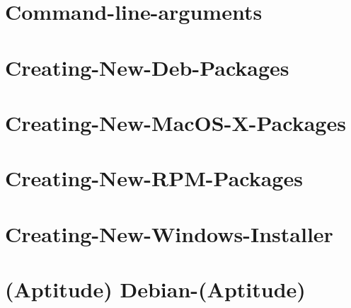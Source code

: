 \documentclass[twoside]{book}
\begin{document}
\chapter{Command-\/line-\/arguments}
\label{md__home_kodemonkey_workspace__t_s_g_l_docs-wiki__command-line-arguments}
\hypertarget{md__home_kodemonkey_workspace__t_s_g_l_docs-wiki__command-line-arguments}{}

\chapter{Creating-\/\-New-\/\-Deb-\/\-Packages}
\label{md__home_kodemonkey_workspace__t_s_g_l_docs-wiki__creating-_new-_deb-_packages}
\hypertarget{md__home_kodemonkey_workspace__t_s_g_l_docs-wiki__creating-_new-_deb-_packages}{}

\chapter{Creating-\/\-New-\/\-Mac\-O\-S-\/\-X-\/\-Packages}
\label{md__home_kodemonkey_workspace__t_s_g_l_docs-wiki__creating-_new-_mac_o_s-_x-_packages}
\hypertarget{md__home_kodemonkey_workspace__t_s_g_l_docs-wiki__creating-_new-_mac_o_s-_x-_packages}{}

\chapter{Creating-\/\-New-\/\-R\-P\-M-\/\-Packages}
\label{md__home_kodemonkey_workspace__t_s_g_l_docs-wiki__creating-_new-_r_p_m-_packages}
\hypertarget{md__home_kodemonkey_workspace__t_s_g_l_docs-wiki__creating-_new-_r_p_m-_packages}{}

\chapter{Creating-\/\-New-\/\-Windows-\/\-Installer}
\label{md__home_kodemonkey_workspace__t_s_g_l_docs-wiki__creating-_new-_windows-_installer}
\hypertarget{md__home_kodemonkey_workspace__t_s_g_l_docs-wiki__creating-_new-_windows-_installer}{}

\chapter{(Aptitude) Debian-\/(Aptitude)}
\label{md__home_kodemonkey_workspace__t_s_g_l_docs-wiki__debian-}
\hypertarget{md__home_kodemonkey_workspace__t_s_g_l_docs-wiki__debian-}{}

\end{document}
